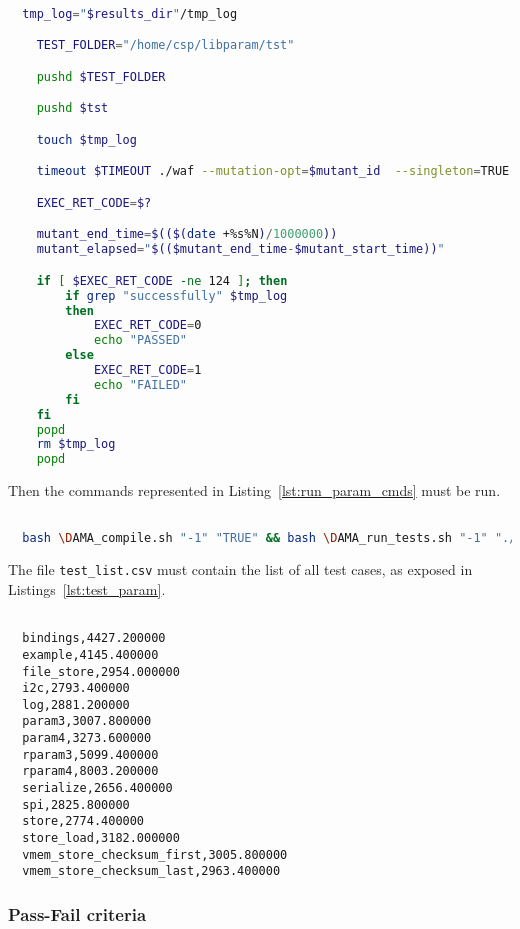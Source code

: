   \begin{lstlisting}[language=bash, label={lst:run_param}]

  tmp_log="$results_dir"/tmp_log

    TEST_FOLDER="/home/csp/libparam/tst"

    pushd $TEST_FOLDER

    pushd $tst

    touch $tmp_log

    timeout $TIMEOUT ./waf --mutation-opt=$mutant_id  --singleton=TRUE 2>&1 | tee $tmp_log

    EXEC_RET_CODE=$?

    mutant_end_time=$(($(date +%s%N)/1000000))
    mutant_elapsed="$(($mutant_end_time-$mutant_start_time))"

    if [ $EXEC_RET_CODE -ne 124 ]; then
        if grep "successfully" $tmp_log
        then
            EXEC_RET_CODE=0
            echo "PASSED"
        else
            EXEC_RET_CODE=1
            echo "FAILED"
        fi
    fi
    popd
    rm $tmp_log
    popd

  \end{lstlisting}

Then the commands represented in Listing~\ref{lst:run_param_cmds} must be run.


  \begin{lstlisting}[language=bash, label={lst:run_param_cmds}]

  bash \DAMA_compile.sh "-1" "TRUE" && bash \DAMA_run_tests.sh "-1" "./test_list.csv" "./"

  \end{lstlisting}

The file \texttt{test\_list.csv} must contain the list of all test cases, as exposed in Listings~\ref{lst:test_param}.

  \begin{lstlisting}[label={lst:test_param}]

  bindings,4427.200000
  example,4145.400000
  file_store,2954.000000
  i2c,2793.400000
  log,2881.200000
  param3,3007.800000
  param4,3273.600000
  rparam3,5099.400000
  rparam4,8003.200000
  serialize,2656.400000
  spi,2825.800000
  store,2774.400000
  store_load,3182.000000
  vmem_store_checksum_first,3005.800000
  vmem_store_checksum_last,2963.400000

  \end{lstlisting}

  \subsubsection{Pass-Fail criteria}

